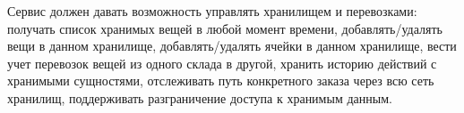 Сервис должен давать возможность управлять
хранилищем и перевозками: получать список хранимых 
вещей в любой момент времени, добавлять/удалять вещи в 
данном хранилище, добавлять/удалять ячейки в данном хранилище,
вести учет перевозок вещей из одного склада в другой, 
хранить историю действий с хранимыми сущностями,
отслеживать путь конкретного заказа через всю сеть хранилищ,
поддерживать разграничение доступа к хранимым данным.
